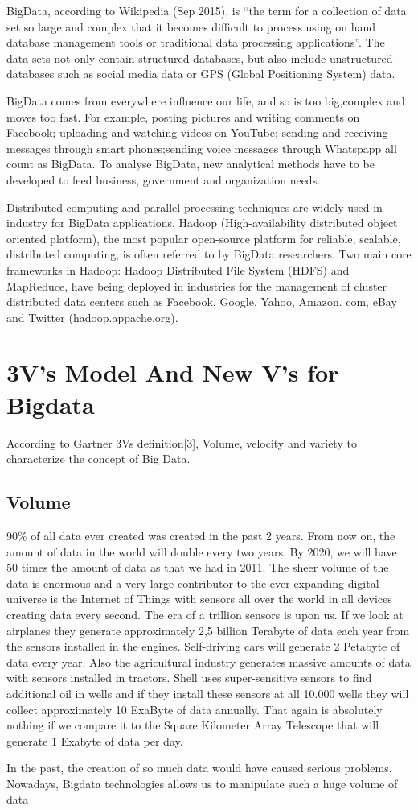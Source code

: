 BigData, according to Wikipedia (Sep 2015), is “the term for a collection of data set so large and complex that it becomes difficult to process using on hand database management tools or traditional data processing applications”. The data-sets not only contain structured databases, but also include unstructured databases such as social media data or GPS (Global Positioning System) data.
\par BigData comes from everywhere influence our life, and so is too big,complex and moves too fast. For example, posting pictures and writing comments on Facebook; uploading and watching videos on YouTube; sending and receiving messages through smart phones;sending voice messages through Whatspapp all count as BigData. To analyse BigData, new analytical methods have to be developed to feed business, government and organization needs.
\par Distributed computing and  parallel processing techniques are widely used in industry for BigData applications. Hadoop (High-availability distributed object oriented platform), the most  popular open-source platform for reliable, scalable, distributed computing, is often referred to by BigData researchers. Two main core frameworks in Hadoop: Hadoop Distributed File System (HDFS) and MapReduce, have being deployed in industries for the management of cluster distributed data centers such as Facebook, Google, Yahoo, Amazon. com, eBay and Twitter (hadoop.appache.org).
\section{3V’s Model And New V’s for Bigdata}
According to Gartner 3Vs definition[3], Volume, velocity and variety to characterize the concept of Big Data.
\subsection{Volume}
90\% of all data ever created was created in the past 2 years. From now on, the amount of data in the world will double every two years. By 2020, we will have 50 times the amount of data as that we had in 2011. The sheer volume of the data is enormous and a very large contributor to the ever expanding digital universe is the Internet of Things with sensors all over the world in all devices creating data every second. The era of a trillion sensors is upon us.
If we look at airplanes they generate approximately 2,5 billion Terabyte of data each year from the sensors installed in the engines.  Self-driving cars will generate 2 Petabyte of data every year. Also the agricultural industry generates massive amounts of data with sensors installed in tractors. Shell uses super-sensitive sensors to find additional oil in wells and if they install these sensors at all 10.000 wells they will collect approximately 10 ExaByte of data annually. That again is absolutely nothing if we compare it to the Square Kilometer Array Telescope that will generate 1 Exabyte of data per day.
\par In the past, the creation of so much data would have caused serious problems. Nowadays, Bigdata technologies allows us  to manipulate such a huge volume of data
